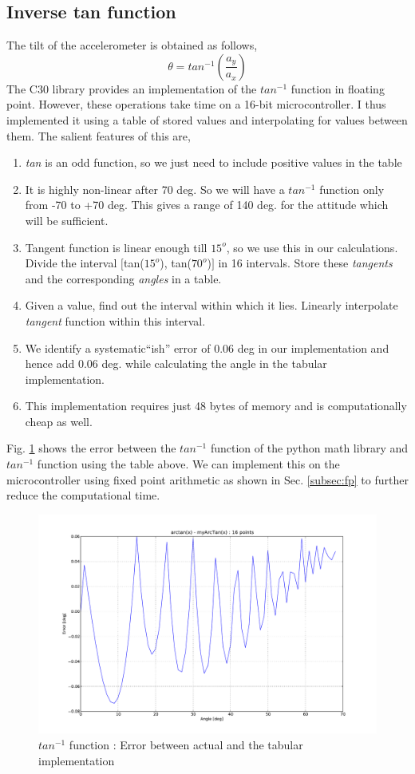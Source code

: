 \subsection*{Inverse tan function}
The tilt of the accelerometer is obtained as follows,
\begin{equation}
\theta = tan^{-1} (\frac{a_y}{a_x})
\end{equation}
The C30 library provides an implementation of the $tan^{-1}$ function in floating point. However, these
operations take time on a 16-bit microcontroller. I thus implemented it using a table of stored values
and interpolating for values between them. The salient features of this are,
\begin{enumerate}
\item
\textit{tan} is an odd function, so we just need to include positive values in the table
\item
It is highly non-linear after 70 deg. So we will have a $tan^{-1}$ function only from -70 to +70 deg.
This gives a range of 140 deg. for the attitude which will be sufficient.
\item
Tangent function is linear enough till $15^{o}$, so we use this in our calculations. Divide the
interval $[$tan($15^{o}$), tan($70^{o}$)$]$ in 16 intervals. Store these \textit{tangents} and
the corresponding \textit{angles} in a table.
\item
Given a value, find out the interval within which it lies. Linearly interpolate \textit{tangent}
function within this interval.
\item
We identify a systematic``ish'' error of 0.06 deg in our implementation and hence add 0.06 deg.
while calculating the angle in the tabular implementation.
\item
This implementation requires just 48 bytes of memory and is computationally cheap as well.
\end{enumerate}
Fig. \ref{fig:5_atanD} shows the error between the $tan^{-1}$ function of the python math library
and $tan^{-1}$ function using the table above. We can implement this on the microcontroller using
fixed point arithmetic as shown in Sec. \ref{subsec:fp} to further reduce the computational time.
\begin{figure}[!h]
\centering
\includegraphics[scale=0.45]{fig/atanD.pdf}
\caption{$tan^{-1}$ function : Error between actual and the tabular implementation}
\label{fig:5_atanD}
\end{figure}

